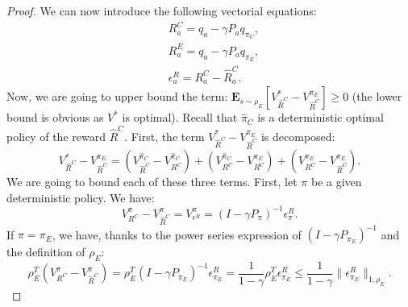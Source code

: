 \documentclass[smallextended]{svjour3}
\newcommand{\E}{\mathbf{E}}
\begin{document}
\begin{proof}
We can now introduce the following vectorial equations:
\begin{align}
&R^C_a=q_a-\gamma P_aq_{\pi_C},
\\
&R^E_a=q_a-\gamma P_aq_{\pi_E},
\\
&\epsilon^R_a=R^C_a-\hat{R}^C_a.
\end{align}
Now, we are going to upper bound the term: $\E_{s\sim\rho_E}[V^*_{\hat{R}^C}-V^{\pi_E}_{\hat{R}^C}]\geq0$ (the lower bound is obvious as $V^*$ is optimal).
Recall that $\hat{\pi}_C$ is a deterministic optimal policy of the reward $\hat{R}^C$. First, the term $V^*_{\hat{R}^C}-V^{\pi_E}_{\hat{R}^C}$ is decomposed:
\begin{equation}
V^*_{\hat{R}^C}-V^{\pi_E}_{\hat{R}^C}=(V^{\hat{\pi}_C}_{\hat{R}^C}-V^{\hat{\pi}_C}_{R^C})+(V^{\hat{\pi}_C}_{R^C}-V^{\pi_E}_{R^C})+(V^{\pi_E}_{R^C}-V^{\pi_E}_{\hat{R}^C}).
\end{equation}
We are going to bound each of these three terms. First, let $\pi$ be a given deterministic policy. We have:
\begin{equation}
V^{\pi}_{R^C}-V^{\pi}_{\hat{R}^C}=V^{\pi}_{\epsilon^R}=(I-\gamma P_\pi)^{-1}\epsilon^R_{\pi}.
\end{equation}
If $\pi=\pi_E$, we have, thanks to the power series expression of $(I-\gamma P_{\pi_E})^{-1}$ and the definition of $\rho_E$:
\begin{equation}
  \rho_E^T(V^{\pi}_{R^C}-V^{\pi}_{\hat{R}^C})=\rho_E^T(I-\gamma P_{\pi_E})^{-1}\epsilon^R_{\pi_E}=\frac{1}{1-\gamma}\rho_E^T\epsilon^R_{\pi_E}\leq\frac{1}{1-\gamma}\|\epsilon^R_{\pi_E}\|_{1,\rho_E}.\end{equation}


\end{proof}
\end{document}

